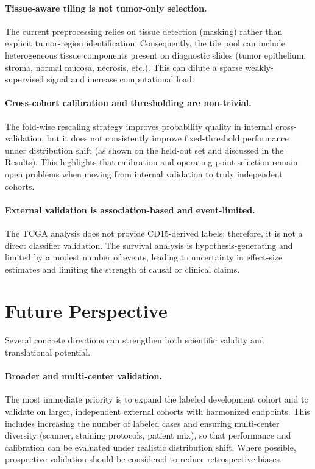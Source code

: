 \paragraph{Tissue-aware tiling is not tumor-only selection.}
The current preprocessing relies on tissue detection (masking) rather than explicit tumor-region identification. Consequently, the tile pool can include heterogeneous tissue components present on diagnostic slides (tumor epithelium, stroma, normal mucosa, necrosis, etc.). This can dilute a sparse weakly-supervised signal and increase computational load.

\paragraph{Cross-cohort calibration and thresholding are non-trivial.}
The fold-wise rescaling strategy improves probability quality in internal cross-validation, but it does not consistently improve fixed-threshold performance under distribution shift (as shown on the held-out set and discussed in the Results). This highlights that calibration and operating-point selection remain open problems when moving from internal validation to truly independent cohorts.

\paragraph{External validation is association-based and event-limited.}
The TCGA analysis does not provide CD15-derived labels; therefore, it is not a direct classifier validation. The survival analysis is hypothesis-generating and limited by a modest number of events, leading to uncertainty in effect-size estimates and limiting the strength of causal or clinical claims.

\section{Future Perspective}
Several concrete directions can strengthen both scientific validity and translational potential.

\paragraph{Broader and multi-center validation.}
The most immediate priority is to expand the labeled development cohort and to validate on larger, independent external cohorts with harmonized endpoints. This includes increasing the number of labeled cases and ensuring multi-center diversity (scanner, staining protocols, patient mix), so that performance and calibration can be evaluated under realistic distribution shift. Where possible, prospective validation should be considered to reduce retrospective biases.

